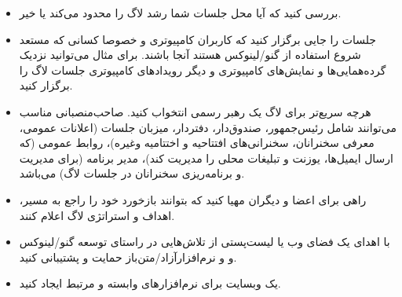 \begin{itemize}
(کاملا اختیاری:) به فکر تأمین وضعیت قانونی رسمی برای گروه باشید،
مانند ثبت شرکت یا وضعیت معافیت مالیاتی.
\item
بررسی کنید که آیا محل جلسات شما رشد لاگ را محدود می‌کند یا خیر.
\item
جلسات را جایی برگزار کنید که کاربران کامپیوتری و خصوصا کسانی که
مستعد شروع استفاده از گنو/لینوکس هستند آنجا باشند. برای مثال می‌توانید
نزدیک گرده‌همایی‌ها و نمایش‌های کامپیوتری و دیگر رویدادهای کامپیوتری
جلسات لاگ را برگزار کنید.
\item
هرچه سریع‌تر برای لاگ یک رهبر رسمی انتخواب کنید. صاحب‌منصبانی مناسب می‌توانند شامل
رئیس‌جمهور، صندوق‌دار، دفتردار، میزبان جلسات (اعلانات عمومی، معرفی سخنرانان، سخنرانی‌های
افتتاحیه و اختتامیه وغیره)، روابط عمومی (که ارسال ایمیل‌ها، یوزنت و تبلیغات محلی را
مدیریت کند)، مدیر برنامه (برای مدیریت و برنامه‌ریزی سخنرانان در جلسات لاگ) می‌باشد.
\item
راهی برای اعضا و دیگران مهیا کنید که بتوانند بازخورد خود را راجع به
مسیر، اهداف و استراتژی لاگ اعلام کنند.
\item
با اهدای یک فضای وب یا لیست‌پستی از تلاش‌هایی در راستای توسعه گنو/لینوکس و
و نرم‌افزارآزاد/متن‌باز حمایت و پشتیبانی کنید.
\item
یک وبسایت برای نرم‌افزارهای وابسته و مرتبط ایجاد کنید.

\end{itemize}
